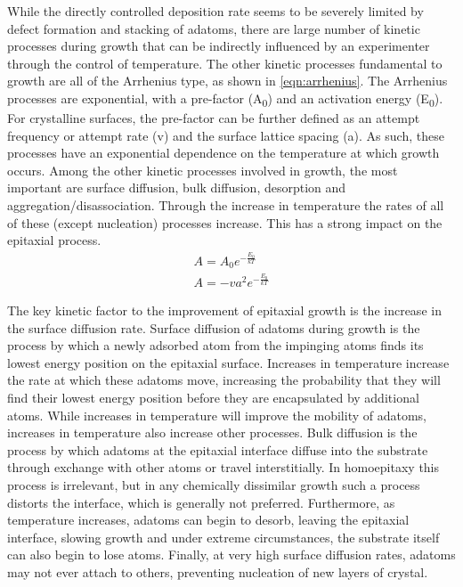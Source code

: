 While the directly controlled deposition rate seems to be severely limited by defect formation and stacking of adatoms, there are large number of kinetic processes during growth that can be indirectly influenced by an experimenter through the control of temperature.
The other kinetic processes fundamental to growth are all of the Arrhenius type, as shown in \cref{eqn:arrhenius}.
The Arrhenius processes are exponential, with a pre-factor (A\textsubscript{0}) and an activation energy (E\textsubscript{0}).
For crystalline surfaces, the pre-factor can be further defined as an attempt frequency or attempt rate (v) and the surface lattice spacing (a)\cite{Einax2013}.
As such, these processes have an exponential dependence on the temperature at which growth occurs.
Among the other kinetic processes involved in growth, the most important are surface diffusion, bulk diffusion, desorption and aggregation/disassociation.
Through the increase in temperature the rates of all of these (except nucleation) processes increase.
This has a strong impact on the epitaxial process.
\begin{align}
    A = A_0 e^{-\frac{E_0}{kT}} \label{eqn:arrhenius} \\
    A = - v a^2 e^{-\frac{E_0}{kT}}
\end{align}

The key kinetic factor to the improvement of epitaxial growth is the increase in the surface diffusion rate.
Surface diffusion of adatoms during growth is the process by which a newly adsorbed atom from the impinging atoms finds its lowest energy position on the epitaxial surface.
Increases in temperature increase the rate at which these adatoms move, increasing the probability that they will find their lowest energy position before they are encapsulated by additional atoms.
While increases in temperature will improve the mobility of adatoms, increases in temperature also increase other processes.
Bulk diffusion is the process by which adatoms at the epitaxial interface diffuse into the substrate through exchange with other atoms or travel interstitially.
In homoepitaxy this process is irrelevant, but in any chemically dissimilar growth such a process distorts the interface, which is generally not preferred.
Furthermore, as temperature increases, adatoms can begin to desorb, leaving the epitaxial interface, slowing growth and under extreme circumstances, the substrate itself can also begin to lose atoms.
Finally, at very high surface diffusion rates, adatoms may not ever attach to others, preventing nucleation of new layers of crystal.

